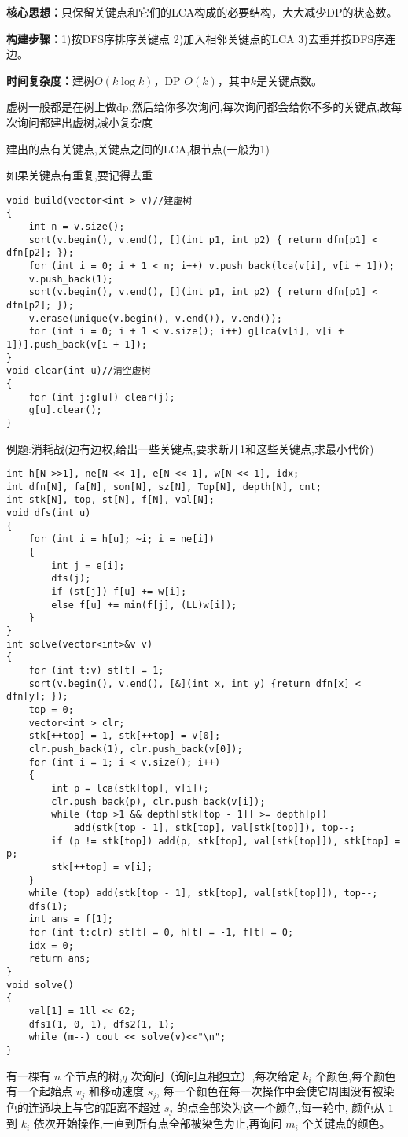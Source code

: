 \documentclass[a4paper, fontset=none]{ctexart}
\begin{document}
\textbf{核心思想：}只保留关键点和它们的LCA构成的必要结构，大大减少DP的状态数。

\textbf{构建步骤：}1)按DFS序排序关键点 2)加入相邻关键点的LCA 3)去重并按DFS序连边。

\textbf{时间复杂度：}建树$O(k\log k)$，DP $O(k)$，其中$k$是关键点数。

虚树一般都是在树上做dp,然后给你多次询问,每次询问都会给你不多的关键点,故每次询问都建出虚树,减小复杂度

建出的点有关键点,关键点之间的LCA,根节点(一般为1)

如果关键点有重复,要记得去重

\begin{verbatim}
void build(vector<int > v)//建虚树
{
    int n = v.size();
    sort(v.begin(), v.end(), [](int p1, int p2) { return dfn[p1] < dfn[p2]; });
    for (int i = 0; i + 1 < n; i++) v.push_back(lca(v[i], v[i + 1]));
    v.push_back(1);
    sort(v.begin(), v.end(), [](int p1, int p2) { return dfn[p1] < dfn[p2]; });
    v.erase(unique(v.begin(), v.end()), v.end());
    for (int i = 0; i + 1 < v.size(); i++) g[lca(v[i], v[i + 1])].push_back(v[i + 1]);
}
void clear(int u)//清空虚树
{
    for (int j:g[u]) clear(j);
    g[u].clear();
}
\end{verbatim}


例题:消耗战(边有边权,给出一些关键点,要求断开1和这些关键点,求最小代价)

\begin{verbatim}
int h[N >>1], ne[N << 1], e[N << 1], w[N << 1], idx;
int dfn[N], fa[N], son[N], sz[N], Top[N], depth[N], cnt;
int stk[N], top, st[N], f[N], val[N];
void dfs(int u)
{
    for (int i = h[u]; ~i; i = ne[i])
    {
        int j = e[i];
        dfs(j);
        if (st[j]) f[u] += w[i];
        else f[u] += min(f[j], (LL)w[i]);
    }
}
int solve(vector<int>&v v)
{
    for (int t:v) st[t] = 1;
    sort(v.begin(), v.end(), [&](int x, int y) {return dfn[x] < dfn[y]; });
    top = 0;
    vector<int > clr;
    stk[++top] = 1, stk[++top] = v[0];
    clr.push_back(1), clr.push_back(v[0]);
    for (int i = 1; i < v.size(); i++)
    {
        int p = lca(stk[top], v[i]);
        clr.push_back(p), clr.push_back(v[i]);
        while (top >1 && depth[stk[top - 1]] >= depth[p])
            add(stk[top - 1], stk[top], val[stk[top]]), top--;
        if (p != stk[top]) add(p, stk[top], val[stk[top]]), stk[top] = p;
        stk[++top] = v[i];
    }
    while (top) add(stk[top - 1], stk[top], val[stk[top]]), top--;
    dfs(1);
    int ans = f[1];
    for (int t:clr) st[t] = 0, h[t] = -1, f[t] = 0;
    idx = 0;
    return ans;
}
void solve()
{
    val[1] = 1ll << 62;
    dfs1(1, 0, 1), dfs2(1, 1);
    while (m--) cout << solve(v)<<"\n";
}
\end{verbatim}
有一棵有 $n$ 个节点的树,$q$ 次询问（询问互相独立）,每次给定 $k_i$ 个颜色,每个颜色有一个起始点 $v_j$ 和移动速度 $s_j$,
每一个颜色在每一次操作中会使它周围没有被染色的连通块上与它的距离不超过 $s_j$ 的点全部染为这一个颜色,每一轮中,
颜色从 $1$ 到 $k_i$ 依次开始操作,一直到所有点全部被染色为止,再询问 $m_i$ 个关键点的颜色。
\end{document}
